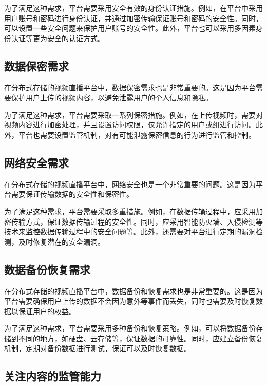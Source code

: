     为了满足这种需求，平台需要采用安全有效的身份认证措施。例如，在平台中采用用户账号和密码进行身份认证，并通过加密传输保证账号和密码的安全性。同时，可以设置一些安全问题来保护用户账号的安全性。此外，平台也可以采用多因素身份认证等更为安全的认证方式。
    
    \subsection{数据保密需求}
    
    在分布式存储的视频直播平台中，数据保密需求也是非常重要的。这是因为平台需要保护用户上传的视频内容，以避免泄露用户的个人信息和隐私。
    
    为了满足这种需求，平台需要采取一系列保密措施。例如，在上传视频时，需要对视频内容进行加密处理，并且设置访问权限，仅允许指定的用户或组进行访问。此外，平台也需要设置监管机制，对有可能泄露保密信息的行为进行监管和控制。
    
    \subsection{网络安全需求}
    
    在分布式存储的视频直播平台中，网络安全也是一个非常重要的问题。这是因为平台需要保证传输数据的安全性和保密性。
    
    为了满足这种需求，平台需要采取多重措施。例如，在数据传输过程中，应采用加密传输方式，保证数据传输过程的安全性。同时，应采用智能防火墙、入侵检测等技术来监控数据传输过程中的安全问题等。此外，还需要对平台进行定期的漏洞检测，及时修复潜在的安全漏洞。
    
    \subsection{数据备份恢复需求}
    
    在分布式存储的视频直播平台中，数据备份和恢复需求也是非常重要的。这是因为平台需要确保用户上传的数据不会因为意外等事件而丢失，同时也需要及时恢复数据以保证用户的权益。
    
    为了满足这种需求，平台需要采用多种备份和恢复策略。例如，可以将数据备份存储到不同的地方，如硬盘、云存储等，保证数据的可靠性。同时，应建立备份恢复机制，定期对备份数据进行测试，保证可以及时恢复数据。
    
    \subsection{关注内容的监管能力}
    
